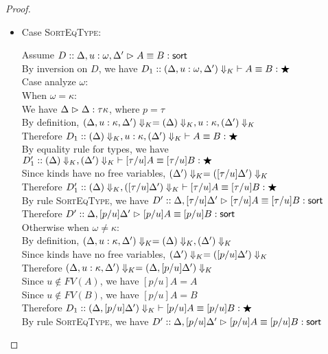 \begin{proof}
\begin{itemize}
\item Case \textsc{SortEqType}:
  \begin{tabbedproof}
    \oo Assume $D :: \judgeSortEq[{\Delta, u:\omega, \Delta'}]{A}{B}$ \\
    \ooo By inversion on $D$, we have $D_1 :: \judgeKeq[{\restrictkind{\Delta, u:\omega, \Delta'}}]{A}{B}{\bigstar}$ \\
    \ooo Case analyze $\omega$: \\
    \oooo When $\omega = \kappa$: \\
    \ooooo We have $\judgeA{\Delta}{\tau}{\kappa}$, where $p = \tau$ \\
    \ooooo By definition, 
           $\restrictkind{\Delta, u:\kappa, \Delta'} = \restrictkind{\Delta}, u:\kappa, \restrictkind{\Delta'}$ \\
    \ooooo Therefore $D_1 :: \judgeKeq[{\restrictkind{\Delta}, u:\kappa, \restrictkind{\Delta'}}]{A}{B}{\bigstar}$ \\
    \ooooo By equality rule for types, we have 
           $D'_1 :: \judgeKeq[{\restrictkind{\Delta}, \restrictkind{\Delta'}}]{[\tau/u]A}{[\tau/u]B}{\bigstar}$ \\
    \ooooo Since kinds have no free variables, $\restrictkind{\Delta'} = \restrictkind{[\tau/u]\Delta'}$ \\
    \ooooo Therefore $D'_1 :: \judgeKeq[{\restrictkind{\Delta}, \restrictkind{[\tau/u]\Delta'}}]{[\tau/u]A}{[\tau/u]B}{\bigstar}$ \\
    \ooooo By rule \textsc{SortEqType}, we have 
            $D' :: \judgeSortEq[{\Delta, [\tau/u]\Delta'}]{[\tau/u]A}{[\tau/u]B}$ \\
    \ooooo Therefore $D' :: \judgeSortEq[{\Delta, [p/u]\Delta'}]{[p/u]A}{[p/u]B}$ \\
    \oooo Otherwise when $\omega \not= \kappa$: \\
    \ooooo By definition, 
           $\restrictkind{\Delta, u:\kappa, \Delta'} = \restrictkind{\Delta}, \restrictkind{\Delta'}$ \\
    \ooooo Since kinds have no free variables, $\restrictkind{\Delta'} = \restrictkind{[p/u]\Delta'}$ \\
    \ooooo Therefore $\restrictkind{\Delta, u:\kappa, \Delta'} = \restrictkind{\Delta, [p/u]\Delta'}$ \\
    \ooooo Since $u \not\in FV(A)$, we have $[p/u]A = A$ \\
    \ooooo Since $u \not\in FV(B)$, we have $[p/u]A = B$ \\
    \ooooo Therefore $D_1 :: \judgeKeq[{\restrictkind{\Delta, [p/u]\Delta'}}]{[p/u]A}{[p/u]B}{\bigstar}$ \\
    \ooooo By rule \textsc{SortEqType}, we have $D' :: \judgeSortEq[{\Delta, [p/u]\Delta'}]{[p/u]A}{[p/u]B}$\\
  \end{tabbedproof}
\end{itemize}
\end{proof}


